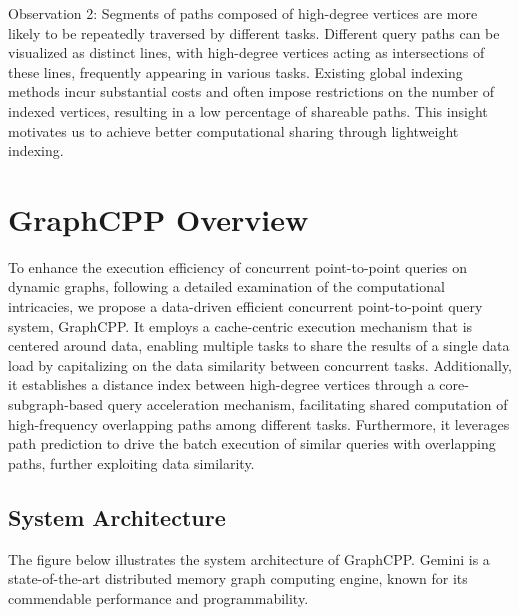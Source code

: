 \documentclass[lettersize,journal]{IEEEtran} %
\begin{document}
Observation 2: Segments of paths composed of high-degree vertices are more likely to be repeatedly traversed by different tasks. Different query paths can be visualized as distinct lines, with high-degree vertices acting as intersections of these lines, frequently appearing in various tasks. Existing global indexing methods incur substantial costs and often impose restrictions on the number of indexed vertices, resulting in a low percentage of shareable paths. This insight motivates us to achieve better computational sharing through lightweight indexing.


\section{GraphCPP Overview}
To enhance the execution efficiency of concurrent point-to-point queries on dynamic graphs, following a detailed examination of the computational intricacies, we propose a data-driven efficient concurrent point-to-point query system, GraphCPP. It employs a cache-centric execution mechanism that is centered around data, enabling multiple tasks to share the results of a single data load by capitalizing on the data similarity between concurrent tasks. Additionally, it establishes a distance index between high-degree vertices through a core-subgraph-based query acceleration mechanism, facilitating shared computation of high-frequency overlapping paths among different tasks. Furthermore, it leverages path prediction to drive the batch execution of similar queries with overlapping paths, further exploiting data similarity.

\subsection{System Architecture}
The figure below illustrates the system architecture of GraphCPP. Gemini is a state-of-the-art distributed memory graph computing engine, known for its commendable performance and programmability.
\end{document}
